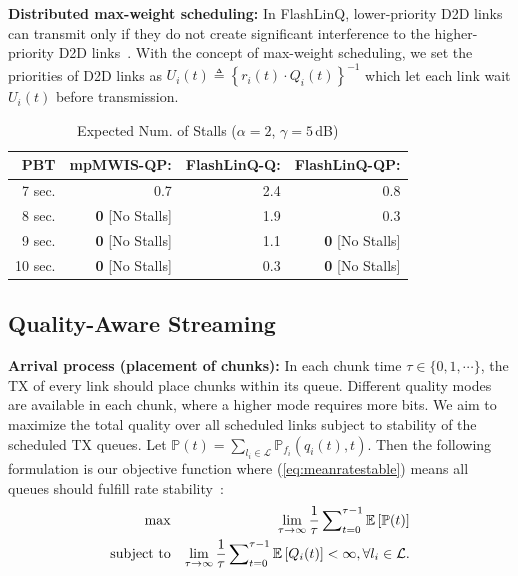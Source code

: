 \documentclass[journal]{IEEEtran}
\begin{document}
\textbf{Distributed max-weight scheduling:}
In FlashLinQ, lower-priority D2D links can transmit only if they do not create significant interference to the higher-priority D2D links~\cite{ton2013wu}.
With the concept of max-weight scheduling, we set the priorities of D2D links as
$U_{i}(t) \triangleq \left\{r_{i}(t)\cdot Q_{i}(t)\right\}^{-1}$
which let each link wait $U_{i}(t)$ before transmission.

\begin{table}[t!]%
{\footnotesize
\caption{Expected Num. of Stalls ($\alpha=2$, $\gamma=5$\,dB)}
\label{tbl-prebuffering2}
    \centering %
	\begin{tabular}{r||r|r|r}
    \hline\hline
    PBT
    & mpMWIS-QP:
    & FlashLinQ-Q:
    & FlashLinQ-QP: \\
	\hline
     7 sec. &   0.7 &  2.4 &  0.8 \\
     8 sec. &   \textbf{0} [No Stalls] &  1.9 &  0.3 \\
     9 sec. &   \textbf{0} [No Stalls] &  1.1 &  \textbf{0} [No Stalls] \\
    10 sec. &   \textbf{0} [No Stalls] &  0.3 &  \textbf{0} [No Stalls] \\
	\hline\hline
	\end{tabular}
}
\end{table}


 \vspace{-2.5mm}
\subsection{Quality-Aware Streaming}\label{sec:streaming}

\textbf{Arrival process (placement of chunks):}
In each chunk time $\tau \in\{0,1,\cdots\}$, the TX of every link should place chunks within its queue. Different quality modes are available in each chunk, where a higher mode requires more bits.
We aim to maximize the total quality over all scheduled links subject to stability of the scheduled TX queues.
Let $\mathbb{P}(t) = \sum_{l_{i}\in\mathcal{L}}\mathbb{P}_{f_{i}}\left(q_{i}(t),t\right)$.
Then the following formulation is our objective function where (\ref{eq:meanratestable}) means all queues should fulfill rate stability~\cite{asilomar2012bethanabhotla}:
\begin{eqnarray}
\max & & \lim_{\tau\rightarrow \infty}\frac{1}{\tau}\sum_{t=0}^{\tau-1}\nolimits \mathbb{E}\left[\mathbb{P}(t)\right]\\
\text{subject to} & & \lim_{\tau\rightarrow \infty}\frac{1}{\tau}\sum_{t=0}^{\tau-1}\nolimits \mathbb{E}\left[Q_{i}(t)\right] < \infty, \forall l_{i} \in\mathcal{L}.\label{eq:meanratestable}
\end{eqnarray}
\end{document}
